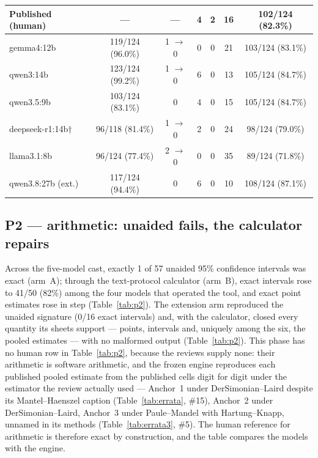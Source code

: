 \documentclass[11pt]{article}
\begin{document}
\begin{table}[H]
\begin{tabular}{lcccccc}
\midrule
Published (human) & --- & --- & 4 & 2 & 16 & 102/124 (82.3\%) \\
\midrule
gemma4:12b & 119/124 (96.0\%) & 1 $\rightarrow$ 0 & 0 & 0 & 21 & 103/124 (83.1\%) \\
qwen3:14b & 123/124 (99.2\%) & 1 $\rightarrow$ 0 & 6 & 0 & 13 & 105/124 (84.7\%) \\
qwen3.5:9b & 103/124 (83.1\%) & 0 & 4 & 0 & 15 & 105/124 (84.7\%) \\
deepseek-r1:14b$\dagger$ & 96/118 (81.4\%) & 1 $\rightarrow$ 0 & 2 & 0 & 24 & 98/124 (79.0\%) \\
llama3.1:8b & 96/124 (77.4\%) & 2 $\rightarrow$ 0 & 0 & 0 & 35 & 89/124 (71.8\%) \\
\midrule
qwen3.8:27b (ext.) & 117/124 (94.4\%) & 0 & 6 & 0 & 10 & 108/124 (87.1\%) \\
\bottomrule
\end{tabular}
\end{table}

\subsection{P2 --- arithmetic: unaided fails, the calculator repairs}
Across the five-model cast, exactly 1 of 57 unaided 95\% confidence intervals was exact (arm~A); through the text-protocol calculator (arm~B), exact intervals rose to 41/50 (82\%) among the four models that operated the tool, and exact point estimates rose in step (Table~\ref{tab:p2}). The extension arm reproduced the unaided signature (0/16 exact intervals) and, with the calculator, closed every quantity its sheets support --- points, intervals and, uniquely among the six, the pooled estimates --- with no malformed output (Table~\ref{tab:p2}). This phase has no human row in Table~\ref{tab:p2}, because the reviews supply none: their arithmetic is software arithmetic, and the frozen engine reproduces each published pooled estimate from the published cells digit for digit under the estimator the review actually used --- Anchor~1 under DerSimonian--Laird despite its Mantel--Haenszel caption (Table~\ref{tab:errata}, \#15), Anchor~2 under DerSimonian--Laird, Anchor~3 under Paule--Mandel with Hartung--Knapp, unnamed in its methods (Table~\ref{tab:errata3}, \#5). The human reference for arithmetic is therefore exact by construction, and the table compares the models with the engine.
\end{document}
